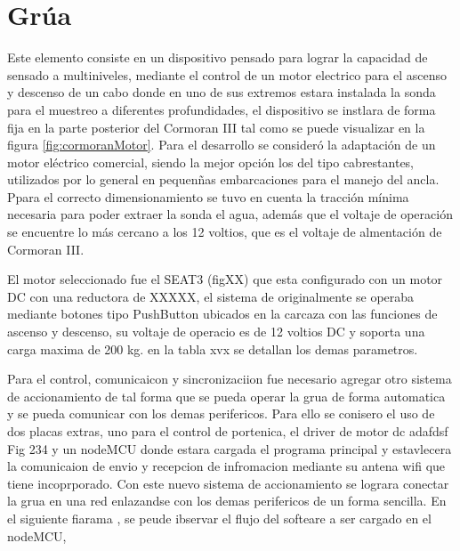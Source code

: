 \section{Gr\'ua}
Este elemento consiste en un dispositivo pensado para lograr la capacidad de sensado a multiniveles, mediante el control de un motor electrico para el ascenso y descenso de un cabo donde en uno de sus extremos estara instalada la sonda para el  muestreo a diferentes profundidades, el dispositivo se instlara de forma fija en la parte posterior del Cormoran III tal como se puede visualizar en la figura \ref{fig:cormoranMotor}.
Para el desarrollo se consider\'o la adaptaci\'on de un motor el\'ectrico comercial, siendo la mejor opci\'on los del tipo cabrestantes, utilizados por lo general en pequen\~nas embarcaciones para el manejo del ancla. Ppara el correcto dimensionamiento se tuvo en cuenta la tracci\'on m\'inima necesaria para poder extraer la sonda el agua, adem\'as que el voltaje de operaci\'on se encuentre lo m\'as cercano a los 12 voltios, que es el voltaje de almentaci\'on de Cormoran III.

El motor seleccionado fue el SEAT3 (figXX) que esta configurado con un motor DC con una reductora de XXXXX, el sistema de originalmente se operaba mediante botones tipo PushButton  ubicados en la carcaza con las funciones de ascenso y descenso, su voltaje de operacio es de 12 voltios DC y soporta una carga maxima de 200 kg. en la tabla xvx se detallan los demas parametros.

Para el control, comunicaicon y sincronizaciion fue necesario agregar otro sistema de accionamiento de tal forma que se pueda operar la grua de forma automatica y se pueda comunicar con los demas perifericos. Para ello se conisero el uso de dos placas extras, uno para el control de portenica, el driver de motor dc adafdsf Fig 234 y un nodeMCU donde estara cargada el programa principal y estavlecera la comunicaion de envio y recepcion de infromacion mediante su antena wifi que tiene incoprporado. 
Con este nuevo sistema de accionamiento se lograra conectar la grua en una red enlazandse con los demas perifericos de un forma sencilla.
En el siguiente fiarama , se peude ibservar el flujo del softeare a ser cargado en el nodeMCU,


